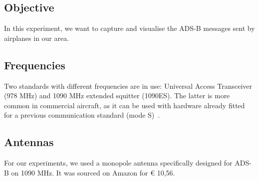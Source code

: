 \documentclass[conference]{IEEEtran}
\begin{document}
\subsection{Objective}
In this experiment, we want to capture and visualise the ADS-B messages sent by airplanes in our area.
\subsection{Frequencies}
Two standards with different frequencies are in use: Universal Access Transceiver (978 MHz) and 1090 MHz extended squitter (1090ES). The latter is more common in commercial aircraft, as it can be used with hardware already fitted for a previous communication standard (mode S)~\cite{strohmeier2014realities}.
\subsection{Antennas}
For our experiments, we used a monopole antenna specifically designed for ADS-B on 1090 MHz. It was sourced on Amazon for € 10,56.
\end{document}
